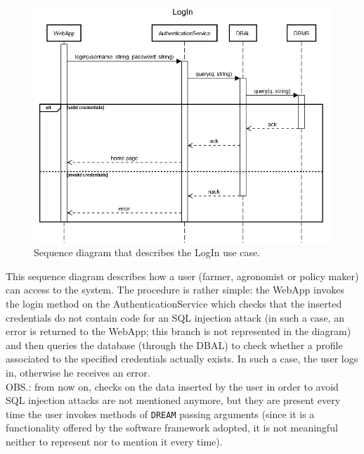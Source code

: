 \documentclass{article}
\begin{document}
\newpage
\begin{figure}[H]
   \centering
   \includegraphics[scale=0.60]{diagrams/sequence diagrams/LogIn.png}
    \caption{Sequence diagram that describes the LogIn use case.}
\end{figure}

This sequence diagram describes how a user (farmer, agronomist or policy maker) can access to the system. The procedure is rather simple: the WebApp invokes the login method on the AuthenticationService which checks that the inserted credentials do not contain code for an SQL injection attack (in such a case, an error is returned to the WebApp; this branch is not represented in the diagram) and then queries the database (through the DBAL) to check whether a profile associated to the specified credentials actually exists. In such a case, the user logs in, otherwise he receives an error.\\
OBS.: from now on, checks on the data inserted by the user in order to avoid SQL injection attacks are not mentioned anymore, but they are present every time the user invokes methods of \verb|DREAM| passing arguments (since it is a functionality offered by the software framework adopted, it is not meaningful neither to represent nor to mention it every time).
\end{document}
